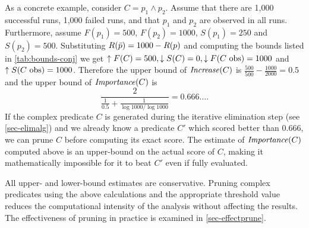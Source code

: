 As a concrete example, consider $C = p_1 \wedge p_2$.  Assume that there are 1,000
successful runs, 1,000 failed runs, and that $p_1$ and $p_2$ are observed in all runs.
Furthermore, assume
$F(p_1) = 500$, $F(p_2) = 1000$, $S(p_1) = 250$ and $S(p_2) = 500$.
Substituting $R(\text{$\bar{p}$}) = 1000 - R(p)$ and computing the bounds listed in
\autoref{tab:bounds-conj} we get $\uparrow F(C) = 500, \downarrow S(C) = 0, \downarrow F(\text{$C$ obs}) = 1000$ and
$\uparrow S(\text{$C$ obs}) = 1000$.  Therefore the upper bound of $\mathit{Increase}(C)$ is
$\frac{500}{500} - \frac{1000}{2000}=0.5$ and the upper bound of $\mathit{Importance}(C)$ is
\begin{equation*}
\frac{2}{\frac{1}{0.5}+\frac{1}{\log{1000}/\log{1000}}} = 0.666\dots.
\end{equation*}
If the complex predicate $C$ is generated during the iterative elimination step (see \autoref{sec-elimalg}) and we already know a predicate $C'$ which scored better than $0.666$, we can prune $C$ before computing its exact score.  The estimate of $\mathit{Importance}(C)$ computed above is an upper-bound on the actual score of $C$, making it mathematically impossible for it to beat $C'$ even if fully evaluated.

All upper- and lower-bound estimates are conservative.  Pruning complex predicates using the above calculations and the appropriate threshold value reduces the computational intensity of the analysis without affecting the results.  The effectiveness of pruning in practice is examined in \autoref{sec-effectprune}.

